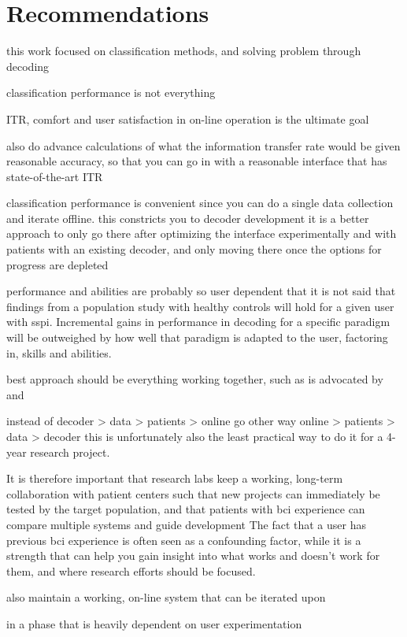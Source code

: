 \section{Recommendations}

this work focused on classification methods, and solving problem through
decoding

classification performance is not everything

ITR, comfort and user satisfaction in on-line operation is the ultimate goal

also do advance calculations of what the information transfer rate would be
given reasonable accuracy, so that you can go in with a reasonable interface
that has state-of-the-art ITR

classification performance is convenient since you can do a single data
collection and iterate offline.
this constricts you to decoder development
it is a better approach to only go there after optimizing the interface
experimentally and with patients with an existing
decoder, and only moving there once the options for progress are depleted

performance and abilities are probably so user dependent that it is not said that
findings from a population study with healthy controls will hold for a given
user with \ac{sspi}.
Incremental gains in performance in decoding for a specific paradigm will be
outweighed by how well that paradigm is adapted to the user, factoring in,
skills and abilities.

best approach should be everything working together, such as is advocated
by~\textcite{Pan2022} and \textcite{Fouad2020}

instead of decoder > data > patients > online
go other way
online > patients > data > decoder
this is unfortunately also the least practical way to do it for a 4-year
research project.

It is therefore important that research labs keep a working, long-term collaboration with
patient centers such that new projects can immediately be tested by the target
population, and that patients with bci experience can compare multiple systems
and guide development
The fact that a user has previous bci experience is often seen as a confounding
factor, while it is a strength that can help you gain insight into what works
and doesn't work for them, and where research efforts should be focused.

also maintain a working, on-line system that can be iterated upon

in a phase that is heavily dependent on user experimentation

